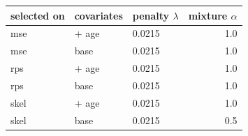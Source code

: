 
\begin{tabular}{lllr}
\toprule
selected on & covariates & penalty $\lambda$ & mixture $\alpha$\\
\midrule
mse & + age & 0.0215 & 1.0\\
mse & base & 0.0215 & 1.0\\
rps & + age & 0.0215 & 1.0\\
rps & base & 0.0215 & 1.0\\
skel & + age & 0.0215 & 1.0\\
skel & base & 0.0215 & 0.5\\
\bottomrule
\end{tabular}
